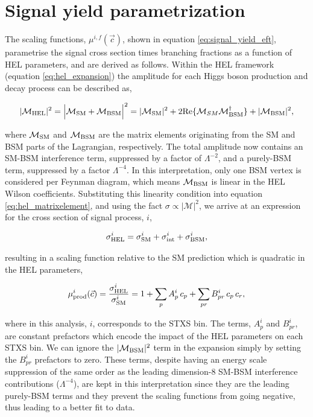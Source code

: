 \section{Signal yield parametrization}\label{sec:eft_parametrisation}
The scaling functions, $\mu^{i,f}(\vec{c})$, shown in equation \ref{eq:signal_yield_eft}, parametrise the signal cross section times branching fractions as a function of HEL parameters, and are derived as follows. Within the HEL framework (equation \ref{eq:hel_expansion}) the amplitude for each Higgs boson production and decay process can be described as,

\begin{equation}\label{eq:hel_matrixelement}
    |\mathcal{M}_{\rm{HEL}}|^2 = \Big| \mathcal{M}_{\rm{SM}} + \mathcal{M}_{\rm{BSM}} \Big|^2 = |\mathcal{M}_{\rm{SM}}|^2 + 2{\rm{Re}}\{\mathcal{M}_{SM}\mathcal{M}^{\dagger}_{\rm{BSM}}\} + |\mathcal{M}_{\rm{BSM}}|^2,
\end{equation}

\noindent
where $\mathcal{M}_{\rm{SM}}$ and $\mathcal{M}_{\rm{BSM}}$ are the matrix elements originating from the SM and BSM parts of the Lagrangian, respectively. The total amplitude now contains an SM-BSM interference term, suppressed by a factor of $\Lambda^{-2}$, and a purely-BSM term, suppressed by a factor $\Lambda^{-4}$. In this interpretation, only one BSM vertex is considered per Feynman diagram, which means $\mathcal{M}_{\rm{BSM}}$ is linear in the HEL Wilson coefficients. Substituting this linearity condition into equation \ref{eq:hel_matrixelement}, and using the fact $\sigma \propto |\mathcal{M}|^2$, we arrive at an expression for the cross section of signal process, $i$,

\begin{equation}
    \sigma^i_{\rm{HEL}} = \sigma^i_{\rm{SM}} + \sigma^i_{\rm{int}} + \sigma^i_{\rm{BSM}},
\end{equation}

\noindent
resulting in a scaling function relative to the SM prediction which is quadratic in the HEL parameters,

\begin{equation}\label{eq:xs_scaling_functions}
    \mu^i_{\rm{prod}}(\vec{c}) = \frac{\sigma^i_{\rm{HEL}}}{\sigma^i_{\rm{SM}}} = 1 + \sum_p A^i_p\,c_p + \sum_{pr} B^i_{pr}\,c_p\,c_r,
\end{equation}

\noindent
where in this analysis, $i$, corresponds to the STXS bin. The terms, $A^i_p$ and $B^i_{pr}$, are constant prefactors which encode the impact of the HEL parameters on each STXS bin. We can ignore the $|\mathcal{M}_{\rm{BSM}}|^2$ term in the expansion simply by setting the $B^i_{pr}$ prefactors to zero. These terms, despite having an energy scale suppression of the same order as the leading dimension-8 SM-BSM interference contributions ($\Lambda^{-4}$), are kept in this interpretation since they are the leading purely-BSM terms and they prevent the scaling functions from going negative, thus leading to a better fit to data.

